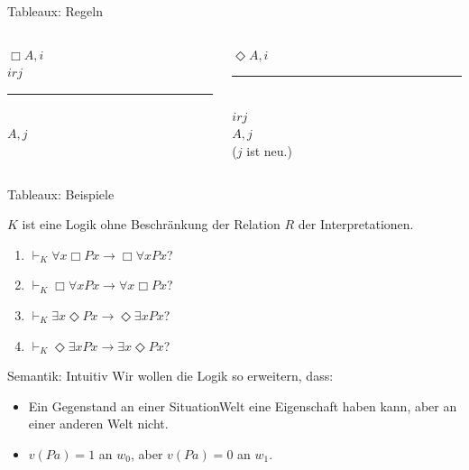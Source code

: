 \documentclass[12pt]{beamer}
\newcommand{\prule}{\vspace{-8pt}\rule{50pt}{0.5pt}}
\begin{document}
\begin{frame}{Tableaux: Regeln}
  \begin{columns}
    \begin{column}[t]{.5 \linewidth}
      \begin{center}
        $\Box A, i$ \\
        $irj$ \\
        \prule \\
        $A, j$
      \end{center}
    \end{column}
    \begin{column}[t]{.5 \linewidth}
      \begin{center}
        $\Diamond A, i$\\
        \prule \\
        $irj$ \\
        $A,j$ \\
        ($j$ ist neu.)
      \end{center}

    \end{column}
  \end{columns}

  
\end{frame}



\begin{frame}{Tableaux: Beispiele}

  $K$ ist eine Logik ohne Beschränkung der Relation $R$ der
  Interpretationen.
  \begin{enumerate}[<+->]
  \item $\vdash_K \forall x \Box Px \to \Box \forall x Px$?
  \item $\vdash_K \Box \forall x Px \to \forall x \Box Px$?
  \item $\vdash_K \exists x \Diamond Px \to \Diamond \exists x Px$?
  \item $\vdash_K \Diamond \exists x Px \to \exists x \Diamond Px$?
  \end{enumerate}


\end{frame}

\begin{frame}{Semantik: Intuitiv}
  Wir wollen die Logik so erweitern, dass: \pause
  \begin{itemize}[<+->]
  \item Ein Gegenstand an einer SituationWelt eine Eigenschaft haben
    kann, aber an einer anderen Welt nicht.
  \item $v(Pa) = 1$ an $w_0$, aber $v(Pa) = 0$ an $w_1$.
  \end{itemize}
\end{frame}
\end{document}

